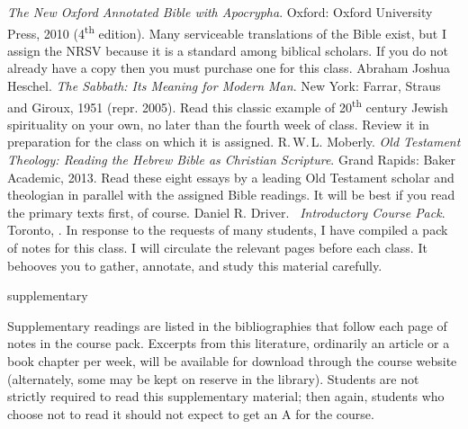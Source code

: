 \documentclass[titlepage]{article}
\begin{document}
\begingroup
\renewcommand{\section}[2]{}%
\begin{thebibliography}{Heschel}%
   \emph{The New Oxford Annotated Bible with Apocrypha}.
    Oxford: Oxford University Press, 2010 (4\textsuperscript{th}
    edition). Many serviceable translations of the Bible exist, but I
    assign the NRSV because it is a standard among biblical scholars. If
    you do not already have a copy then you must purchase one for this
    class.
   Abraham Joshua Heschel.
    \emph{The Sabbath: Its Meaning for Modern Man}. New York: Farrar,
    Straus and Giroux, 1951 (repr. 2005). Read this classic example of
    20\textsuperscript{th} century Jewish spirituality on your own, no
    later than the fourth week of class. Review it in preparation for the
    class on which it is assigned.
   R.\,W.\,L. Moberly.
    \emph{Old Testament Theology: Reading the Hebrew Bible as Christian
    Scripture}. Grand Rapids: Baker Academic, 2013. Read these eight
    essays by a leading Old Testament scholar and theologian in parallel
    with the assigned Bible readings. It will be best if you read the
    primary texts first, of course.
   Daniel R. Driver.
    \emph{\ctitle\ Introductory Course Pack}. Toronto, \csemester.
    In response to the requests of many students, I have compiled a pack
    of notes for this class. I will circulate the relevant pages before
    each class. It behooves you to gather, annotate, and study this
    material carefully.
\end{thebibliography}
\endgroup

\section{Supplementary Texts}
\label{supplementary}

Supplementary readings are listed in the bibliographies that follow each
page of notes in the course pack. Excerpts from this literature,
ordinarily an article or a book chapter per week, will be available for
download through the course website (alternately, some may be kept on
reserve in the library). Students are not strictly required to read this
supplementary material; then again, students who choose not to read it
should not expect to get an A for the course.
\end{document}
